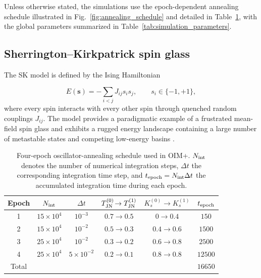 \documentclass[
reprint,
amsmath,amssymb,
aps,
pre,
floatfix,
]{revtex4-2}
\begin{document}
Unless otherwise stated, the simulations use the epoch-dependent annealing
schedule illustrated in Fig.~\ref{fig:annealing_schedule} and detailed in
Table~\ref{tab:annealing_schedule}, with the global parameters summarized in
Table~\ref{tab:simulation_parameters}.

\subsection{Sherrington--Kirkpatrick spin glass}

The SK model is defined by the Ising Hamiltonian

\begin{equation}
E(\mathbf{s})=
-\sum_{i<j} J_{ij}s_i s_j,
\qquad
s_i\in \lbrace-1,+1\rbrace,
\label{eq:SK}
\end{equation}
where every spin interacts with every other spin through quenched random couplings $J_{ij}$. The model provides a paradigmatic example of a frustrated mean-field spin glass and exhibits a rugged energy landscape containing a large number of metastable states and competing low-energy basins \cite{SK1,SK2,BinderYoung1986,MPV1987}.

\begin{table}[t]
\caption{
Four-epoch oscillator-annealing schedule used in OIM+.
$N_{\rm int}$ denotes the number of numerical integration steps,
$\Delta t$ the corresponding integration time step, and
$t_{\rm epoch}=N_{\rm int}\Delta t$ the accumulated integration time
during each epoch.
}
\label{tab:annealing_schedule}
\begin{ruledtabular}
\begin{tabular}{cccccc}
Epoch &
$N_{\rm int}$ &
$\Delta t$ &
$T_{\rm JN}^{(0)}\!\rightarrow T_{\rm JN}^{(1)}$ &
$K_s^{(0)}\!\rightarrow K_s^{(1)}$ &
$t_{\rm epoch}$ \\
\hline
1 & $15\times10^4$ & $10^{-3}$ &
$0.7\rightarrow0.5$ &
$0\rightarrow0.4$ &
$150$ \\

2 & $15\times10^4$ & $10^{-2}$ &
$0.5\rightarrow0.3$ &
$0.4\rightarrow0.6$ &
$1500$ \\

3 & $25\times10^4$ & $10^{-2}$ &
$0.3\rightarrow0.2$ &
$0.6\rightarrow0.8$ &
$2500$ \\

4 & $25\times10^4$ & $5\times10^{-2}$ &
$0.2\rightarrow0.1$ &
$0.8\rightarrow0.8$ &
$12500$ \\
\hline
Total & & & & & $16650$ \\
\end{tabular}
\end{ruledtabular}
\end{table}
\end{document}
